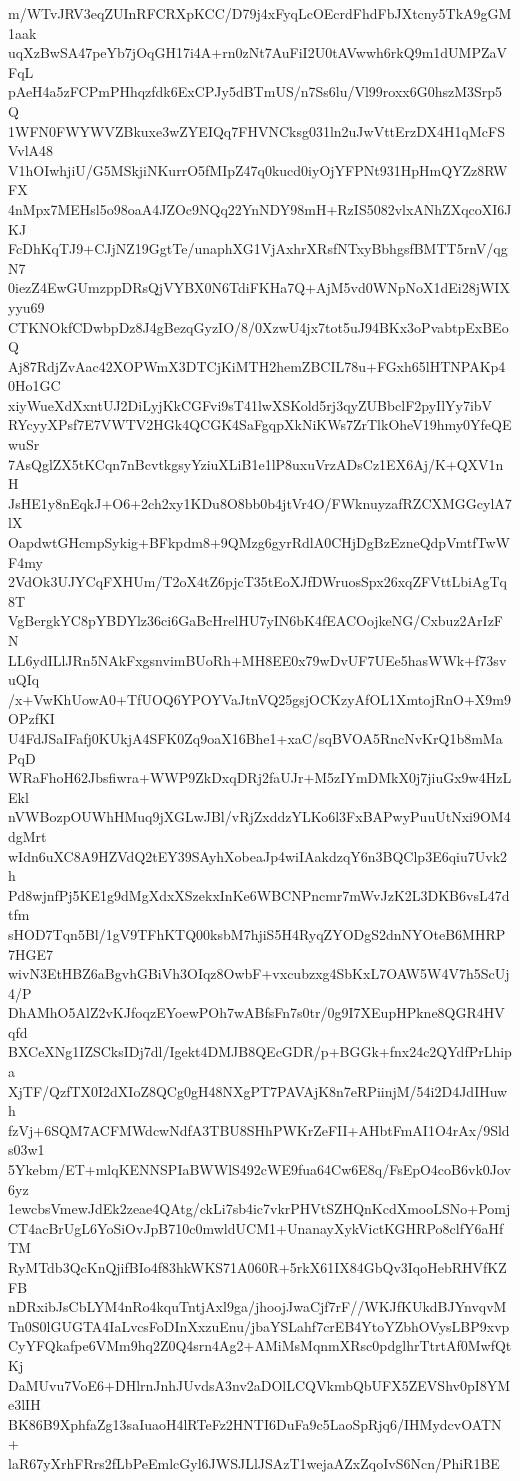 m/WTvJRV3eqZUInRFCRXpKCC/D79j4xFyqLcOEcrdFhdFbJXtcny5TkA9gGM1aak
uqXzBwSA47peYb7jOqGH17i4A+rn0zNt7AuFiI2U0tAVwwh6rkQ9m1dUMPZaVFqL
pAeH4a5zFCPmPHhqzfdk6ExCPJy5dBTmUS/n7Ss6lu/Vl99roxx6G0hszM3Srp5Q
1WFN0FWYWVZBkuxe3wZYEIQq7FHVNCksg031ln2uJwVttErzDX4H1qMcFSVvlA48
V1hOIwhjiU/G5MSkjiNKurrO5fMIpZ47q0kucd0iyOjYFPNt931HpHmQYZz8RWFX
4nMpx7MEHsl5o98oaA4JZOc9NQq22YnNDY98mH+RzIS5082vlxANhZXqcoXI6JKJ
FcDhKqTJ9+CJjNZ19GgtTe/unaphXG1VjAxhrXRsfNTxyBbhgsfBMTT5rnV/qgN7
0iezZ4EwGUmzppDRsQjVYBX0N6TdiFKHa7Q+AjM5vd0WNpNoX1dEi28jWIXyyu69
CTKNOkfCDwbpDz8J4gBezqGyzIO/8/0XzwU4jx7tot5uJ94BKx3oPvabtpExBEoQ
Aj87RdjZvAac42XOPWmX3DTCjKiMTH2hemZBCIL78u+FGxh65lHTNPAKp40Ho1GC
xiyWueXdXxntUJ2DiLyjKkCGFvi9sT41lwXSKold5rj3qyZUBbclF2pyIlYy7ibV
RYcyyXPsf7E7VWTV2HGk4QCGK4SaFgqpXkNiKWs7ZrTlkOheV19hmy0YfeQEwuSr
7AsQglZX5tKCqn7nBcvtkgsyYziuXLiB1e1lP8uxuVrzADsCz1EX6Aj/K+QXV1nH
JsHE1y8nEqkJ+O6+2ch2xy1KDu8O8bb0b4jtVr4O/FWknuyzafRZCXMGGcylA7lX
OapdwtGHcmpSykig+BFkpdm8+9QMzg6gyrRdlA0CHjDgBzEzneQdpVmtfTwWF4my
2VdOk3UJYCqFXHUm/T2oX4tZ6pjcT35tEoXJfDWruosSpx26xqZFVttLbiAgTq8T
VgBergkYC8pYBDYlz36ci6GaBcHrelHU7yIN6bK4fEACOojkeNG/Cxbuz2ArIzFN
LL6ydILlJRn5NAkFxgsnvimBUoRh+MH8EE0x79wDvUF7UEe5hasWWk+f73svuQIq
/x+VwKhUowA0+TfUOQ6YPOYVaJtnVQ25gsjOCKzyAfOL1XmtojRnO+X9m9OPzfKI
U4FdJSaIFafj0KUkjA4SFK0Zq9oaX16Bhe1+xaC/sqBVOA5RncNvKrQ1b8mMaPqD
WRaFhoH62Jbsfiwra+WWP9ZkDxqDRj2faUJr+M5zIYmDMkX0j7jiuGx9w4HzLEkl
nVWBozpOUWhHMuq9jXGLwJBl/vRjZxddzYLKo6l3FxBAPwyPuuUtNxi9OM4dgMrt
wIdn6uXC8A9HZVdQ2tEY39SAyhXobeaJp4wiIAakdzqY6n3BQClp3E6qiu7Uvk2h
Pd8wjnfPj5KE1g9dMgXdxXSzekxInKe6WBCNPncmr7mWvJzK2L3DKB6vsL47dtfm
sHOD7Tqn5Bl/1gV9TFhKTQ00ksbM7hjiS5H4RyqZYODgS2dnNYOteB6MHRP7HGE7
wivN3EtHBZ6aBgvhGBiVh3OIqz8OwbF+vxcubzxg4SbKxL7OAW5W4V7h5ScUj4/P
DhAMhO5AlZ2vKJfoqzEYoewPOh7wABfsFn7s0tr/0g9I7XEupHPkne8QGR4HVqfd
BXCeXNg1IZSCksIDj7dl/Igekt4DMJB8QEcGDR/p+BGGk+fnx24c2QYdfPrLhipa
XjTF/QzfTX0I2dXIoZ8QCg0gH48NXgPT7PAVAjK8n7eRPiinjM/54i2D4JdIHuwh
fzVj+6SQM7ACFMWdcwNdfA3TBU8SHhPWKrZeFII+AHbtFmAI1O4rAx/9Slds03w1
5Ykebm/ET+mlqKENNSPIaBWWlS492cWE9fua64Cw6E8q/FsEpO4coB6vk0Jov6yz
1ewcbsVmewJdEk2zeae4QAtg/ckLi7sb4ic7vkrPHVtSZHQnKcdXmooLSNo+Pomj
CT4acBrUgL6YoSiOvJpB710c0mwldUCM1+UnanayXykVictKGHRPo8clfY6aHfTM
RyMTdb3QcKnQjifBIo4f83hkWKS71A060R+5rkX61IX84GbQv3IqoHebRHVfKZFB
nDRxibJsCbLYM4nRo4kquTntjAxl9ga/jhoojJwaCjf7rF//WKJfKUkdBJYnvqvM
Tn0S0lGUGTA4IaLvcsFoDInXxzuEnu/jbaYSLahf7crEB4YtoYZbhOVysLBP9xvp
CyYFQkafpe6VMm9hq2Z0Q4srn4Ag2+AMiMsMqnmXRsc0pdglhrTtrtAf0MwfQtKj
DaMUvu7VoE6+DHlrnJnhJUvdsA3nv2aDOlLCQVkmbQbUFX5ZEVShv0pI8YMe3lIH
BK86B9XphfaZg13saIuaoH4lRTeFz2HNTI6DuFa9c5LaoSpRjq6/IHMydcvOATN+
laR67yXrhFRrs2fLbPeEmlcGyl6JWSJLlJSAzT1wejaAZxZqoIvS6Ncn/PhiR1BE
